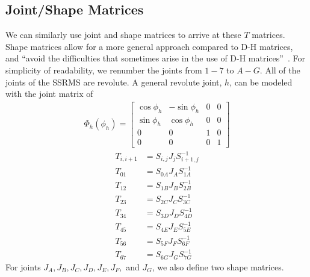 \documentclass{article}
\begin{document}
\subsection{Joint/Shape Matrices}
We can similarly use joint and shape matrices to arrive at these $T$ matrices.
Shape matrices allow for a more general approach compared to D-H matrices, and ``avoid the difficulties that sometimes arise in the use of D-H matrices''~\cite{uicker2013matrix}.
For simplicity of readability, we renumber the joints from $1-7$ to $A-G$.
All of the joints of the SSRMS are revolute.
A general revolute joint, $h$, can be modeled with the joint matrix of
\begin{align*}
\Phi_h \left( \phi_h \right) =
\left[\begin{matrix}
\cos \phi_h & -\sin \phi_h & 0 & 0 \\
\sin \phi_h & \cos \phi_h & 0 & 0 \\
0 & 0 & 1 & 0 \\
0 & 0 & 0 & 1
\end{matrix}\right]
\end{align*}
\begin{align}
T_{i,i+1} &= S_{i, j} J_j S_{i+1,j}^{-1} \label{joint_eq} \\
T_{01} &= S_{0A} J_A S_{1A}^{-1} \nonumber \\
T_{12} &= S_{1B} J_B S_{2B}^{-1} \nonumber \\
T_{23} &= S_{2C} J_C S_{3C}^{-1} \nonumber \\
T_{34} &= S_{3D} J_D S_{4D}^{-1} \nonumber \\
T_{45} &= S_{4E} J_E S_{5E}^{-1} \nonumber \\
T_{56} &= S_{5F} J_F S_{6F}^{-1} \nonumber \\
T_{67} &= S_{6G} J_G S_{7G}^{-1} \nonumber
\end{align}
For joints $J_A, J_B, J_C, J_D, J_E, J_F,$ and $J_G$, we also define two shape matrices.
\end{document}
